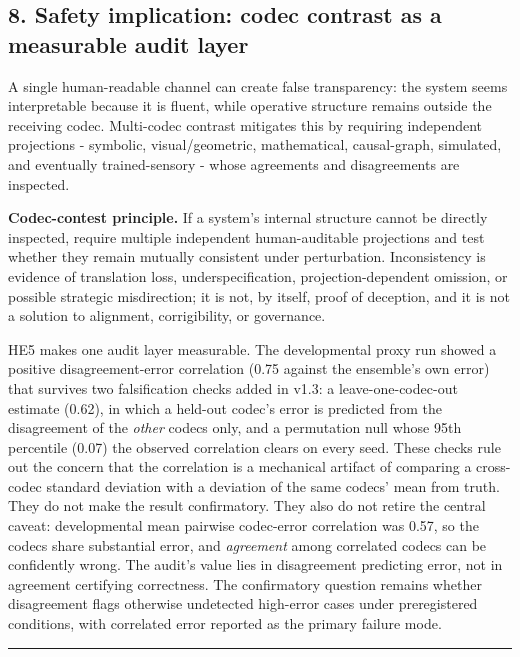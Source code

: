 \documentclass[
  11pt,
]{article}
\begin{document}
\subsection{8. Safety implication: codec contrast as a
measurable audit
layer}\label{safety-implication-codec-contrast-as-a-measurable-audit-layer}

A single human-readable channel can create false
transparency: the system seems interpretable because it
is fluent, while operative structure remains outside
the receiving codec. Multi-codec contrast mitigates
this by requiring independent projections - symbolic,
visual/geometric, mathematical, causal-graph,
simulated, and eventually trained-sensory - whose
agreements and disagreements are inspected.

\textbf{Codec-contest principle.} If a system's
internal structure cannot be directly inspected,
require multiple independent human-auditable
projections and test whether they remain mutually
consistent under perturbation. Inconsistency is
evidence of translation loss, underspecification,
projection-dependent omission, or possible strategic
misdirection; it is not, by itself, proof of deception,
and it is not a solution to alignment, corrigibility,
or governance.

HE5 makes one audit layer measurable. The developmental
proxy run showed a positive disagreement-error
correlation (0.75 against the ensemble's own error)
that survives two falsification checks added in v1.3: a
leave-one-codec-out estimate (0.62), in which a
held-out codec's error is predicted from the
disagreement of the \emph{other} codecs only, and a
permutation null whose 95th percentile (0.07) the
observed correlation clears on every seed. These checks
rule out the concern that the correlation is a
mechanical artifact of comparing a cross-codec standard
deviation with a deviation of the same codecs' mean
from truth. They do not make the result confirmatory.
They also do not retire the central caveat:
developmental mean pairwise codec-error correlation was
0.57, so the codecs share substantial error, and
\emph{agreement} among correlated codecs can be
confidently wrong. The audit's value lies in
disagreement predicting error, not in agreement
certifying correctness. The confirmatory question
remains whether disagreement flags otherwise undetected
high-error cases under preregistered conditions, with
correlated error reported as the primary failure mode.

\begin{center}\rule{0.5\linewidth}{0.5pt}\end{center}
\end{document}

